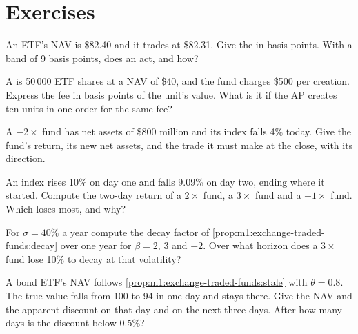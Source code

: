 \section{Exercises}

\begin{exercise}[$\star$]\label{exo:m1:exchange-traded-funds:1}
An ETF's NAV is \$82.40 and it trades at \$82.31. Give the  in basis
points. With a band of 9 basis points, does an  act,
and how?
\end{exercise}

\begin{exercise}[$\star$]\label{exo:m1:exchange-traded-funds:2}
A  is 50\,000 ETF shares at a NAV of \$40, and the fund charges
\$500 per creation. Express the fee in basis points of the unit's value. What
is it if the AP creates ten units in one order for the same fee?
\end{exercise}

\begin{exercise}[$\star$]\label{exo:m1:exchange-traded-funds:3}
A $-2\times$ fund has net assets of \$800 million and its index falls 4\%
today. Give the fund's return, its new net assets, and the trade it must make
at the close, with its direction.
\end{exercise}

\begin{exercise}[$\star\star$]\label{exo:m1:exchange-traded-funds:4}
An index rises 10\% on day one and falls 9.09\% on day two, ending where it
started. Compute the two-day return of a $2\times$ fund, a $3\times$ fund and
a $-1\times$ fund. Which loses most, and why?
\end{exercise}

\begin{exercise}[$\star\star$]\label{exo:m1:exchange-traded-funds:5}
For $\sigma = 40\%$ a year compute the decay factor of
\cref{prop:m1:exchange-traded-funds:decay} over one year for $\beta = 2$, $3$
and $-2$. Over what horizon does a $3\times$ fund lose 10\% to decay at that
volatility?
\end{exercise}

\begin{exercise}[$\star\star$]\label{exo:m1:exchange-traded-funds:6}
A bond ETF's NAV follows \cref{prop:m1:exchange-traded-funds:stale} with
$\theta = 0.8$. The true value falls from 100 to 94 in one day and stays
there. Give the NAV and the apparent discount on that day and on the next
three days. After how many days is the discount below 0.5\%?
\end{exercise}

